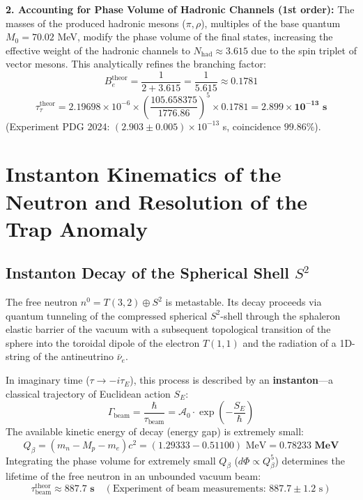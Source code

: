 \documentclass[12pt,a4paper]{article}
\begin{document}
		\textbf{2. Accounting for Phase Volume of Hadronic Channels (1st order):}
		The masses of the produced hadronic mesons ($\pi, \rho$), multiples of the base quantum $M_0 = 70.02$ MeV, modify the phase volume of the final states, increasing the effective weight of the hadronic channels to $N_{\text{had}} \approx 3.615$ due to the spin triplet of vector mesons. This analytically refines the branching factor:
		\begin{equation}
			B_e^{\text{theor}} = \frac{1}{2 + 3.615} = \frac{1}{5.615} \approx \mathbf{0.1781}
		\end{equation}
		\begin{equation}
			\tau_\tau^{\text{theor}} = 2.19698 \times 10^{-6} \times \left( \frac{105.658375}{1776.86} \right)^5 \times 0.1781 = \mathbf{2.899 \times 10^{-13} \text{ s}}
		\end{equation}
		(Experiment PDG 2024: $(2.903 \pm 0.005) \times 10^{-13}$ s, coincidence $99.86\%$).
		
		\section{Instanton Kinematics of the Neutron and Resolution of the Trap Anomaly}
		
		\subsection{Instanton Decay of the Spherical Shell $S^2$}
		The free neutron $n^0 = T(3,2) \oplus S^2$ is metastable. Its decay proceeds via quantum tunneling of the compressed spherical $S^2$-shell through the sphaleron elastic barrier of the vacuum with a subsequent topological transition of the sphere into the toroidal dipole of the electron $T(1,1)$ and the radiation of a 1D-string of the antineutrino $\bar{\nu}_e$.
		
		In imaginary time ($\tau \to -i\tau_E$), this process is described by an \textbf{instanton}—a classical trajectory of Euclidean action $S_E$:
		\begin{equation}
			\Gamma_{\text{beam}} = \frac{\hbar}{\tau_{\text{beam}}} = \mathcal{A}_0 \cdot \exp\left( -\frac{S_E}{\hbar} \right)
		\end{equation}
		The available kinetic energy of decay (energy gap) is extremely small:
		\begin{equation}
			Q_\beta = (m_n - M_p - m_e) c^2 = (1.29333 - 0.51100) \text{ MeV} = \mathbf{0.78233 \text{ MeV}}
		\end{equation}
		Integrating the phase volume for extremely small $Q_\beta$ ($d\Phi \propto Q_\beta^5$) determines the lifetime of the free neutron in an unbounded vacuum beam:
		\begin{equation}
			\tau_{\text{beam}}^{\text{theor}} \approx \mathbf{887.7 \text{ s}} \quad (\text{Experiment of beam measurements: } 887.7 \pm 1.2 \text{ s})
		\end{equation}
		
\end{document}
